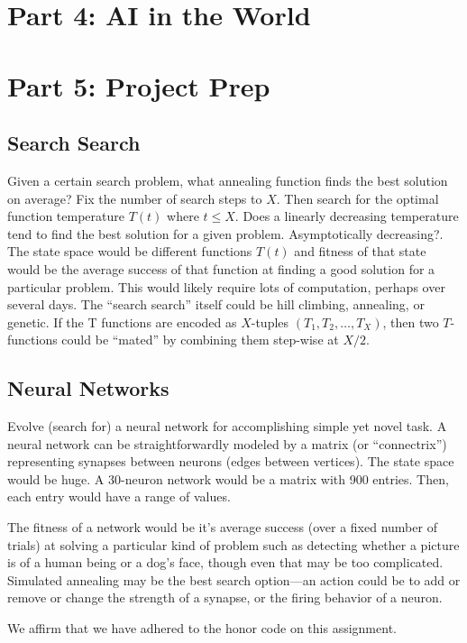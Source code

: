 \documentclass[11pt]{amsart}
\newcommand{\honor}{We affirm that we have adhered to the honor code on this assignment.}
\begin{document}

\section*{Part 4: AI in the World}

\section*{Part 5: Project Prep}


\subsection*{Search Search}
Given a certain search problem, what annealing function finds the best solution
on average? Fix the number of search steps to $X$. Then search for the optimal
function temperature $T(t)$ where $t \leq X$. Does a linearly decreasing temperature
tend to find the best solution for a given problem.  Asymptotically
decreasing?. The state space would be different functions $T(t)$ and fitness of
that state would be the average success of that function at finding a good
solution for a particular problem. This would likely require lots of
computation, perhaps over several days. The “search search” itself could be
hill climbing, annealing, or genetic. If the T functions are encoded as
$X$-tuples $(T_1, T_2, \dots, T_X)$, then two $T$-functions could be “mated” by
combining them step-wise at $X/2$.

\subsection*{Neural Networks}
Evolve (search for) a neural network for accomplishing simple yet novel task. A
neural network can be straightforwardly modeled by a matrix (or “connectrix”)
representing synapses between neurons (edges between vertices). The state space
would be huge. A 30-neuron network would be a matrix with 900 entries. Then,
each entry would have a range of values.

The fitness of a network would be it's average success (over a fixed number of
trials) at solving a particular kind of problem such as detecting whether a
picture is of a human being or a dog's face, though even that may be too
complicated. Simulated annealing may be the best search option\----an action could
be to add or remove or change the strength of a synapse, or the firing behavior
of a neuron.

\honor
\end{document}
